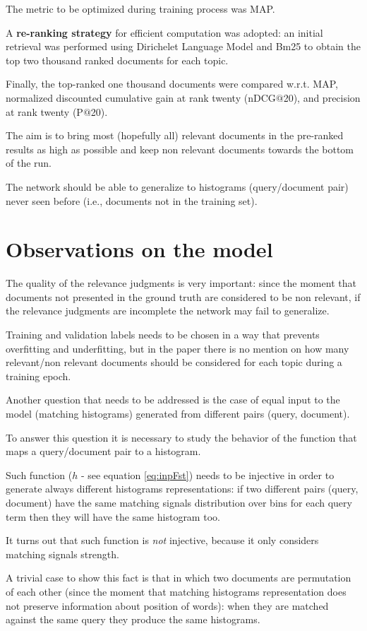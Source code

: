 The metric to be optimized during training process was MAP.

A \textbf{re-ranking strategy} for efficient computation was adopted: an initial retrieval was performed using Dirichelet Language Model and Bm25 to obtain the top two thousand ranked documents for each topic.

Finally, the top-ranked one thousand documents were compared w.r.t. MAP, normalized discounted cumulative gain at rank twenty (nDCG$@$20), and precision at rank twenty (P$@$20).

The aim is to bring most (hopefully all) relevant documents in the pre-ranked results as high as possible and keep non relevant documents towards the bottom of the run.

The network should be able to generalize to histograms (query/document pair) never seen before (i.e., documents not in the training set).

\section{Observations on the model}

The quality of the relevance judgments is very important: since the moment that documents not presented in the ground truth are considered to be non relevant, if the relevance judgments are incomplete the network may fail to generalize.

Training and validation labels needs to be chosen in a way that prevents overfitting and underfitting, but in the paper there is no mention on how many relevant/non relevant documents should be considered for each topic during a training epoch.

Another question that needs to be addressed is the case of equal input to the model (matching histograms) generated from different pairs (query, document).

To answer this question it is necessary to study the behavior of the function that maps a query/document pair to a histogram.

Such function ($h$ - see equation \ref{eq:inpFst}) needs to be injective in order to generate always different histograms representations: if two different pairs (query, document) have the same matching signals distribution over bins for each query term then they will have the same histogram too.

It turns out that such function is \textit{not} injective, because it only considers matching signals strength.

A trivial case to show this fact is that in which two documents are permutation of each other (since the moment that matching histograms representation does not preserve information about position of words): when they are matched against the same query they produce the same histograms.